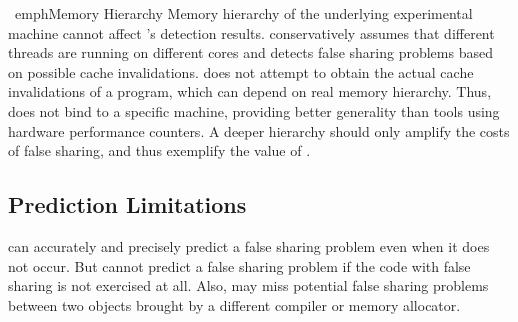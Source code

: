 \ emph{Memory Hierarchy} Memory hierarchy of the underlying experimental machine cannot affect \Predator{}'s detection results. \Predator{} conservatively assumes that different threads are running on different cores and detects false sharing problems based on possible cache invalidations. \Predator{} does not attempt to obtain the actual cache invalidations of a program, which can depend on real memory hierarchy. Thus, \Predator{} does not bind to a specific machine, providing better generality than tools using hardware performance counters. A deeper hierarchy should only amplify the costs of false sharing, and thus exemplify the value of \Predator{}.

\subsection{Prediction Limitations} 
\Predator{} can accurately and precisely predict a false sharing problem even when it does not occur. But \Predator{} cannot predict a false sharing problem if the code with false sharing is not exercised at all. Also, \Predator{} may miss potential false sharing problems between two objects brought by a different compiler or memory allocator. 
